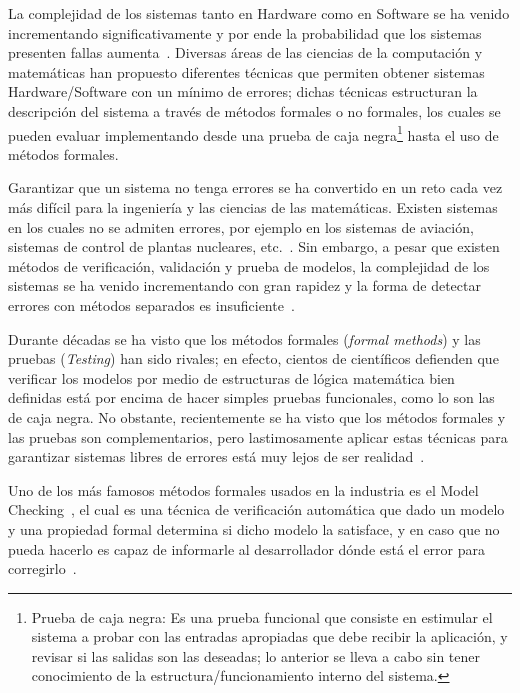 

\noindent La complejidad de los sistemas tanto en Hardware como en Software se 
ha venido  incrementando significativamente y por ende la probabilidad que los 
sistemas presenten fallas aumenta~\cite{Schneider2004}. Diversas \'areas de 
las ciencias de la computaci\'on y matem\'aticas han propuesto diferentes 
t\'ecnicas que permiten obtener sistemas Hardware/Software con un m\'inimo 
de errores; dichas t\'ecnicas estructuran la descripci\'on del sistema a 
trav\'es de m\'etodos formales o no formales, los cuales se pueden evaluar 
implementando desde una prueba de caja negra\footnote{Prueba de caja negra: Es 
una prueba funcional que consiste en estimular el sistema a probar con las 
entradas apropiadas que debe recibir la aplicaci\'on, y revisar si las salidas 
son las deseadas; lo anterior se lleva a cabo sin tener conocimiento de la 
estructura/funcionamiento interno del sistema.} hasta el uso de m\'etodos 
formales.

Garantizar que un sistema no tenga errores se ha convertido en un reto cada vez 
m\'as dif\'icil para la ingenier\'ia y las ciencias de las matem\'aticas. 
Existen sistemas en los cuales no se admiten errores, por ejemplo en los 
sistemas de aviaci\'on, sistemas de control de plantas nucleares, etc.~\cite{Bowen2000}. Sin embargo, a pesar que existen m\'etodos de 
verificaci\'on, validaci\'on y prueba de modelos, la complejidad de los sistemas 
se ha venido incrementando con gran rapidez y la forma de detectar errores con 
m\'etodos separados es insuficiente~\cite{Bowen2002}. 

Durante d\'ecadas se ha visto que los m\'etodos formales (\textit{formal 
methods}) y las pruebas  (\textit{Testing})  han sido rivales;  en efecto, 
cientos de cient\'ificos defienden que verificar los modelos por medio de 
estructuras de l\'ogica matem\'atica bien definidas est\'a por encima de hacer 
simples pruebas funcionales, como lo son las de caja negra.  No obstante, 
recientemente se ha visto que los m\'etodos formales y las pruebas son 
complementarios, pero lastimosamente aplicar estas t\'ecnicas para 
garantizar sistemas libres de errores est\'a muy lejos de ser realidad~\cite{Gaudel1996,Bowen2002,Hierons2009}. 

Uno de los m\'as famosos m\'etodos formales usados en la industria es el Model 
Checking~\cite{Mikovski2009}, el cual es una t\'ecnica de verificaci\'on 
autom\'atica que dado un modelo y una propiedad formal determina si dicho modelo 
la satisface, y en caso que no pueda hacerlo es capaz de informarle al 
desarrollador d\'onde est\'a el error para corregirlo~\cite{Arias2012, 
Mikovski2009}. 

